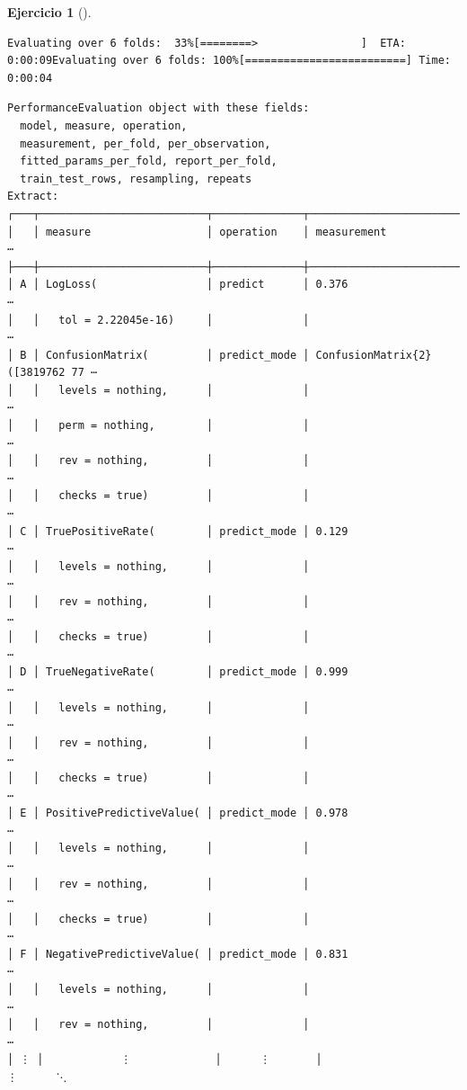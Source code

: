 \documentclass[
  a4paper,
]{scrreport}
\theoremstyle{definition}
\newtheorem{exercise}{Ejercicio}[chapter]
\theoremstyle{remark}
\begin{document}
\begin{exercise}[]
\begin{enumerate}
\begin{tcolorbox}
\begin{verbatim}
Evaluating over 6 folds:  33%[========>                ]  ETA: 0:00:09Evaluating over 6 folds: 100%[=========================] Time: 0:00:04
\end{verbatim}

\begin{verbatim}
PerformanceEvaluation object with these fields:
  model, measure, operation,
  measurement, per_fold, per_observation,
  fitted_params_per_fold, report_per_fold,
  train_test_rows, resampling, repeats
Extract:
┌───┬──────────────────────────┬──────────────┬─────────────────────────────────
│   │ measure                  │ operation    │ measurement                    ⋯
├───┼──────────────────────────┼──────────────┼─────────────────────────────────
│ A │ LogLoss(                 │ predict      │ 0.376                          ⋯
│   │   tol = 2.22045e-16)     │              │                                ⋯
│ B │ ConfusionMatrix(         │ predict_mode │ ConfusionMatrix{2}([3819762 77 ⋯
│   │   levels = nothing,      │              │                                ⋯
│   │   perm = nothing,        │              │                                ⋯
│   │   rev = nothing,         │              │                                ⋯
│   │   checks = true)         │              │                                ⋯
│ C │ TruePositiveRate(        │ predict_mode │ 0.129                          ⋯
│   │   levels = nothing,      │              │                                ⋯
│   │   rev = nothing,         │              │                                ⋯
│   │   checks = true)         │              │                                ⋯
│ D │ TrueNegativeRate(        │ predict_mode │ 0.999                          ⋯
│   │   levels = nothing,      │              │                                ⋯
│   │   rev = nothing,         │              │                                ⋯
│   │   checks = true)         │              │                                ⋯
│ E │ PositivePredictiveValue( │ predict_mode │ 0.978                          ⋯
│   │   levels = nothing,      │              │                                ⋯
│   │   rev = nothing,         │              │                                ⋯
│   │   checks = true)         │              │                                ⋯
│ F │ NegativePredictiveValue( │ predict_mode │ 0.831                          ⋯
│   │   levels = nothing,      │              │                                ⋯
│   │   rev = nothing,         │              │                                ⋯
│ ⋮ │            ⋮             │      ⋮       │                         ⋮      ⋱

\end{verbatim}
\end{tcolorbox}
\end{enumerate}
\end{exercise}
\end{document}
